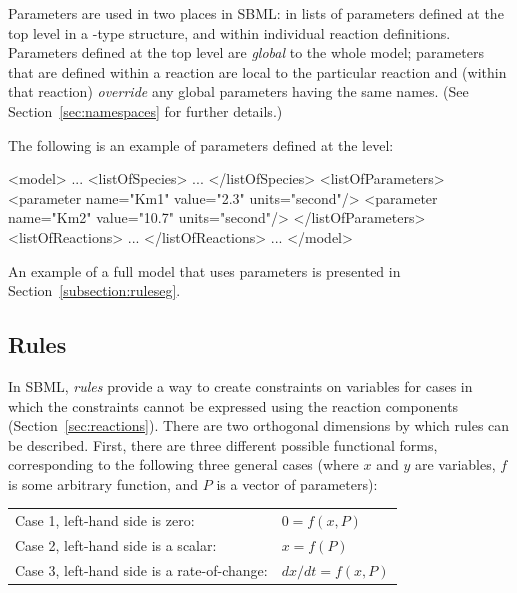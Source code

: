 \documentclass[10pt]{cekarticle}
\begin{document}
Parameters are used in two places in SBML: in lists of parameters defined
at the top level in a -type structure, and within individual
reaction definitions.  Parameters defined at the top level are
\emph{global} to the whole model; parameters that are defined within
a reaction are local to the particular reaction and (within that reaction)
\emph{override} any global parameters having the same names.  (See
Section~\ref{sec:namespaces} for further details.)

The following is an example of parameters defined at the  level:

\begin{example}
<model>
    ...
    <listOfSpecies>
        ...
    </listOfSpecies>
    <listOfParameters>
        <parameter name="Km1" value="2.3" units="second"/>
        <parameter name="Km2" value="10.7" units="second"/>
    </listOfParameters>
    <listOfReactions>
        ...
    </listOfReactions>
    ...
</model>
\end{example}

An example of a full model that uses parameters is presented in
Section~\ref{subsection:ruleseg}.


\subsection{Rules}
\label{sec:rules}

In SBML, \emph{rules} provide a way to create constraints on variables for
cases in which the constraints cannot be expressed using the reaction
components (Section~\ref{sec:reactions}).  There are two orthogonal
dimensions by which rules can be described.  First, there are three
different possible functional forms, corresponding to the following three
general cases (where $x$ and $y$ are variables, $f$ is some arbitrary
function, and $P$ is a vector of parameters):

\begin{center}
\begin{tabular}{ll}
  Case 1, left-hand side is zero:             & $0 = f(x, P)$\\
  Case 2, left-hand side is a scalar:         & $x = f(P)$\\
  Case 3, left-hand side is a rate-of-change: & $dx/dt = f(x, P)$
\end{tabular}
\end{center}
\end{document}
